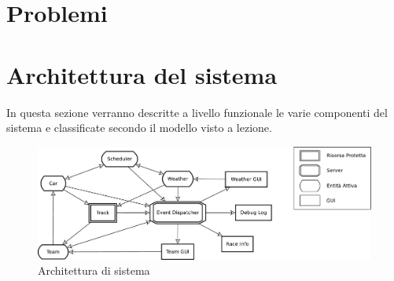 \documentclass[11pt,a4paper]{report}
\begin{document}





\chapter{Problemi}


\chapter{Architettura del sistema}
In questa sezione verranno descritte a livello funzionale le varie componenti del sistema e classificate secondo il modello visto a lezione.
\begin{landscape}
\begin{figure}
\includegraphics[height=.25\paperheight]{diagrammi/Arch}
\caption{Architettura di sistema}
\label{fig:architettura}
\end{figure}
\end{landscape}
\end{document}
